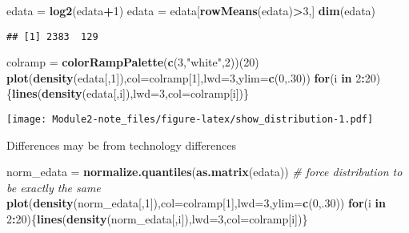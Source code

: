 \documentclass[]{article}
\newenvironment{Shaded}{\begin{snugshade}}{\end{snugshade}}
\newcommand{\KeywordTok}[1]{\textcolor[rgb]{0.13,0.29,0.53}{\textbf{#1}}}
\newcommand{\DataTypeTok}[1]{\textcolor[rgb]{0.13,0.29,0.53}{#1}}
\newcommand{\DecValTok}[1]{\textcolor[rgb]{0.00,0.00,0.81}{#1}}
\newcommand{\StringTok}[1]{\textcolor[rgb]{0.31,0.60,0.02}{#1}}
\newcommand{\CommentTok}[1]{\textcolor[rgb]{0.56,0.35,0.01}{\textit{#1}}}
\newcommand{\ControlFlowTok}[1]{\textcolor[rgb]{0.13,0.29,0.53}{\textbf{#1}}}
\newcommand{\OperatorTok}[1]{\textcolor[rgb]{0.81,0.36,0.00}{\textbf{#1}}}
\newcommand{\NormalTok}[1]{#1}
\begin{document}
\begin{Shaded}
\begin{Highlighting}[]
\NormalTok{edata =}\StringTok{ }\KeywordTok{log2}\NormalTok{(edata}\OperatorTok{+}\DecValTok{1}\NormalTok{)}
\NormalTok{edata =}\StringTok{ }\NormalTok{edata[}\KeywordTok{rowMeans}\NormalTok{(edata)}\OperatorTok{>}\DecValTok{3}\NormalTok{,]}
\KeywordTok{dim}\NormalTok{(edata)}
\end{Highlighting}
\end{Shaded}

\begin{verbatim}
## [1] 2383  129
\end{verbatim}

\begin{Shaded}
\begin{Highlighting}[]
\NormalTok{colramp =}\StringTok{ }\KeywordTok{colorRampPalette}\NormalTok{(}\KeywordTok{c}\NormalTok{(}\DecValTok{3}\NormalTok{,}\StringTok{"white"}\NormalTok{,}\DecValTok{2}\NormalTok{))(}\DecValTok{20}\NormalTok{)}
\KeywordTok{plot}\NormalTok{(}\KeywordTok{density}\NormalTok{(edata[,}\DecValTok{1}\NormalTok{]),}\DataTypeTok{col=}\NormalTok{colramp[}\DecValTok{1}\NormalTok{],}\DataTypeTok{lwd=}\DecValTok{3}\NormalTok{,}\DataTypeTok{ylim=}\KeywordTok{c}\NormalTok{(}\DecValTok{0}\NormalTok{,.}\DecValTok{30}\NormalTok{))}
\ControlFlowTok{for}\NormalTok{(i }\ControlFlowTok{in} \DecValTok{2}\OperatorTok{:}\DecValTok{20}\NormalTok{)\{}\KeywordTok{lines}\NormalTok{(}\KeywordTok{density}\NormalTok{(edata[,i]),}\DataTypeTok{lwd=}\DecValTok{3}\NormalTok{,}\DataTypeTok{col=}\NormalTok{colramp[i])\}}
\end{Highlighting}
\end{Shaded}

\texttt{[image: Module2-note\_files/figure-latex/show\_distribution-1.pdf]}

Differences may be from technology differences

\begin{Shaded}
\begin{Highlighting}[]
\NormalTok{norm_edata =}\StringTok{ }\KeywordTok{normalize.quantiles}\NormalTok{(}\KeywordTok{as.matrix}\NormalTok{(edata)) }\CommentTok{# force distribution to be exactly the same}
\KeywordTok{plot}\NormalTok{(}\KeywordTok{density}\NormalTok{(norm_edata[,}\DecValTok{1}\NormalTok{]),}\DataTypeTok{col=}\NormalTok{colramp[}\DecValTok{1}\NormalTok{],}\DataTypeTok{lwd=}\DecValTok{3}\NormalTok{,}\DataTypeTok{ylim=}\KeywordTok{c}\NormalTok{(}\DecValTok{0}\NormalTok{,.}\DecValTok{30}\NormalTok{))}
\ControlFlowTok{for}\NormalTok{(i }\ControlFlowTok{in} \DecValTok{2}\OperatorTok{:}\DecValTok{20}\NormalTok{)\{}\KeywordTok{lines}\NormalTok{(}\KeywordTok{density}\NormalTok{(norm_edata[,i]),}\DataTypeTok{lwd=}\DecValTok{3}\NormalTok{,}\DataTypeTok{col=}\NormalTok{colramp[i])\}}
\end{Highlighting}
\end{Shaded}
\end{document}
